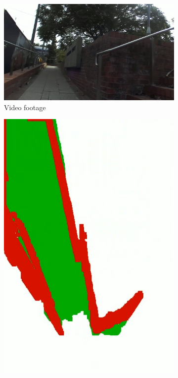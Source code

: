 \begin{figure}[b]
    \centering
    \begin{subfigure}{.6\textwidth}
        \centering
        \includegraphics[width=\linewidth]{images/vfh_example_video.PNG}
        \caption{Video footage}
    \end{subfigure}
    \quad
    \begin{subfigure}{.3\textwidth}
        \centering
        \includegraphics[width=\linewidth]{images/vfh_example_map.PNG}

\end{subfigure}
\end{figure}
